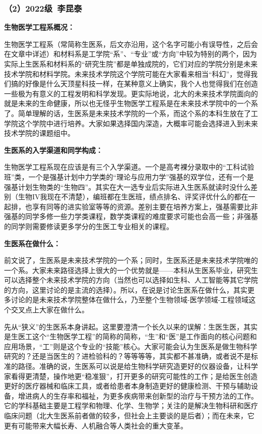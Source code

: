 \documentclass[11pt,oneside]{book}
\begin{document}
\subsubsection{（2）2022级\ 李昆泰}
\textbf{生物医学工程系概况：}

生物医学工程系（常简称生医系，后文亦沿用，这个名字可能小有误导性，之后会在文章中详述）和材料系是工学院“系”、“专业”或“方向”中较为特别的两个，因为实际上生医系和材料系的“研究生院”都是单独成院的，它们对应的学院分别是未来技术学院和材料学院。未来技术学院这个学院可能在大家看来相当“科幻”，觉得我们搞的好像是什么天顶星科技一样，在某种意义上确实，我个人也觉得我们在创造一些极为有意义的工程发明和科学发现。更实际地说，北大的未来技术学院面向的就是未来的生命健康，所以也无怪乎生物医学工程系是在未来技术学院中的一个系了。简单理解的话，生医系是未来技术学院的一个系，而这个系的本科生放在了工学院这个学院中进行培养。大家如果选择国内深造，大概率可能会选择进入到未来技术学院的课题组中。

\textbf{生医系的入学渠道和同学构成：}

生物医学工程系现在应该是有三个入学渠道。一个是高考裸分录取中的“工科试验班”类，一个是强基计划中力学类的“理论与应用力学”强基的双学位，还有一个是强基计划生物类的“生物四”。其实在大一选专业后实际进入生医系就读时没什么差别（生物IV我现在不清楚），编班都在生医班，绩点排名、评奖评优什么的都在一起排，也享有同等的进实验室等等的资源。差别主要在培养方案上，强基需要比非强基的同学多修一些力学类课程，数学类课程的难度要求可能也会高一些；非强基的同学则需要修读更多学分的生医工专业相关的课程。

\textbf{生医系在做什么：}

前文说了，生医系是未来技术学院的一个系；同时，生医系还是未来技术学院唯的一个系。大家未来路径选择上很大的一个优势就是——本科从生医系毕业，研究生可以选择整个未来技术学院的方向（当然也可以选择如生科、人工智能等其它学院的方向，这里讨论的是主流的选择）。所以，在说是讨论生医系在做什么，其实更多讨论的是未来技术学院整体在做什么，乃至整个生物领域-医学领域-工程领域这个交叉点上大家在做什么。

先从“狭义”的生医系本身讲起。这里要澄清一个长久以来的误解：生医生医，其实是生医工这个“生物医学工程”的简称的简称，“生”和“医”是工作面向的核心问题和应用场景，“工”则是这个专业的“技能”核心。大家可能会认为生医系是做生物科学研究的？还是当医生的？进检验科的？等等等等，其实都不甚准确，或者说不是标准的路径。准确的说，生医系可以说是给生物科学研究造更好的仪器设备，让科学家看得更清楚，操作地更“稳准狠”，打开更多的研究可能性的工作；是给医生创造更好的医疗器械和临床工具，或者给患者本身制造更好的健康检测、干预与辅助设备，增进病人的生存率和福祉，为更多疾病带来创新型的治疗与干预方法的工作。它的学科基础主要是工程学和物理、化学、生物学；关注的是解决生物科研和医疗临床问题（北大生医系前者做的较多，但社会上主要谈的是后者）；而在未来，它更有可能带来大幅长寿、人机融合等人类社会的重大变革。
\end{document}
